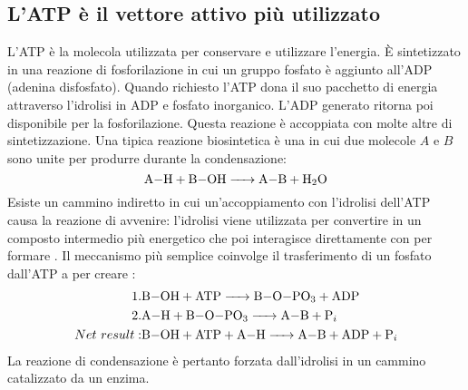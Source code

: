\subsection{L'ATP \`e il vettore attivo pi\`u utilizzato}
L'ATP \`e la molecola utilizzata per conservare e utilizzare l'energia. \`E sintetizzato in una reazione di fosforilazione in cui un gruppo fosfato \`e aggiunto all'ADP (adenina 
disfosfato). Quando richiesto l'ATP dona il suo pacchetto di energia attraverso l'idrolisi in ADP e fosfato inorganico. L'ADP generato ritorna poi disponibile per la fosforilazione. 
Questa reazione \`e accoppiata con molte altre di sintetizzazione. Una tipica reazione biosintetica \`e una in cui due molecole $A$ e $B$ sono unite per produrre  durante la 
condensazione: 
$$\ce{A-H + B-OH -> A-B + H2O}$$
Esiste un cammino indiretto in cui un'accoppiamento con l'idrolisi dell'ATP causa la reazione di avvenire: l'idrolisi viene utilizzata per convertire  in un composto 
intermedio pi\`u energetico che poi interagisce direttamente con  per formare . Il meccanismo pi\`u semplice coinvolge il trasferimento di un fosfato dall'ATP a 
per creare :
\begin{align*}
	1. & \ce{B-OH + ATP  ->  B-O-PO_3 + ADP}\\
	2. & \ce{A-H + B-O-PO_3 -> A-B + P_i}\\
	Net\ result: & \ce{B-OH + ATP + A-H  ->   A-B + ADP + P_i}\\
\end{align*}
La reazione di condensazione \`e pertanto forzata dall'idrolisi in un cammino catalizzato da un enzima. 
